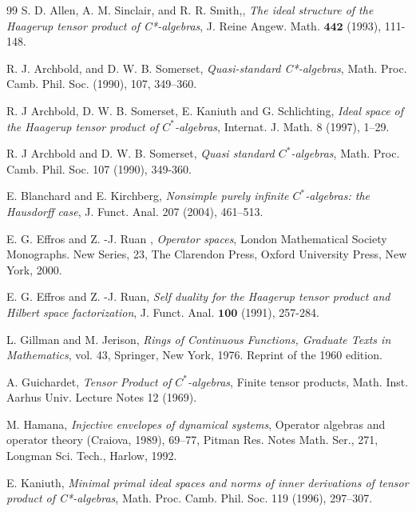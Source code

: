 \documentclass{birkjour}
\theoremstyle{definition}
\theoremstyle{remark}
\numberwithin{equation}{section}
\begin{document}
\begin{thebibliography}{99}\itemsep=2pt
{\sc S. D. Allen, A. M. Sinclair,  and R. R. Smith,},
{\it The ideal structure of the Haagerup tensor
product of C*-algebras}, 
J. Reine Angew. Math. $\mathbf{442}$ (1993), 111-148.


{\sc R. J. Archbold,  and D. W. B. Somerset}, 
{\it Quasi-standard C*-algebras}, Math. Proc. Camb. Phil. Soc. (1990), 107, 349--360.



{\sc R. J
 Archbold, D. W. B. Somerset, E. Kaniuth and G. Schlichting}, 
{\it Ideal space of the Haagerup tensor product of $C^{\ast}$-algebras}, 
Internat. J. Math. 8 (1997), 1–29.

{\sc R. J
 Archbold and D. W. B. Somerset}, 
{\it Quasi standard $C^{\ast}$-algebras}, 
Math. Proc. Camb. Phil. Soc. 107 (1990), 349-360.

{\sc  E. Blanchard and E. Kirchberg}, {\it Nonsimple purely infinite $C^{\ast}$-algebras: the Hausdorff case}, J. Funct. Anal. 207 (2004), 461–513.

{\sc E. G. Effros and Z. -J. Ruan }, 
{\it Operator spaces}, 
London Mathematical Society Monographs. New Series, 23, The Clarendon Press, Oxford University Press, New York, 2000. 

{\sc E. G. Effros and Z. -J. Ruan}, 
{\it Self duality for the Haagerup tensor product and Hilbert space factorization}, 
J. Funct. Anal. $\mathbf{100}$ (1991), 257-284.




{\sc L. Gillman and M. Jerison}, {\it{Rings of Continuous Functions}, Graduate Texts in Mathematics}, vol. 43, Springer, New York, 1976. Reprint of the 1960 edition.




{\sc A. Guichardet}, 
{\it Tensor Product of $C^*$-algebras}, 
Finite tensor products, Math. Inst. Aarhus Univ. Lecture Notes 12 (1969).


{\sc M. Hamana}, 
{\it Injective envelopes of dynamical systems}, 
Operator algebras and operator theory (Craiova, 1989), 69--77, Pitman Res. Notes Math. Ser., 271, Longman Sci. Tech., Harlow, 1992. 


{\sc E. Kaniuth}, 
{\it Minimal primal ideal spaces and norms of inner derivations of tensor product of C*-algebras}, 
Math. Proc. Camb. Phil. Soc. 119 (1996), 297–307.


\end{thebibliography}
\end{document}
